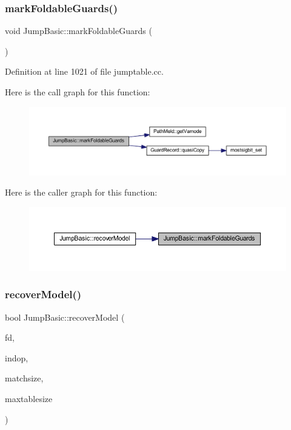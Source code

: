 \subsubsection{\texorpdfstring{markFoldableGuards()}{markFoldableGuards()}}
{\footnotesize\ttfamily void Jump\+Basic\+::mark\+Foldable\+Guards (\begin{DoxyParamCaption}\item[{void}]{ }\end{DoxyParamCaption})\hspace{0.3cm}{\ttfamily [protected]}}



Definition at line 1021 of file jumptable.\+cc.

Here is the call graph for this function\+:
\nopagebreak
\begin{figure}[H]
\begin{center}
\leavevmode
\includegraphics[width=350pt]{class_jump_basic_a8a8537f11c7ee4431d0b7ccce30d3241_cgraph}
\end{center}
\end{figure}
Here is the caller graph for this function\+:
\nopagebreak
\begin{figure}[H]
\begin{center}
\leavevmode
\includegraphics[width=350pt]{class_jump_basic_a8a8537f11c7ee4431d0b7ccce30d3241_icgraph}
\end{center}
\end{figure}
\mbox{\label{class_jump_basic_aebf055ad4baf1a138107d8dd3a40c809}} 
\subsubsection{\texorpdfstring{recoverModel()}{recoverModel()}}
{\footnotesize\ttfamily bool Jump\+Basic\+::recover\+Model (\begin{DoxyParamCaption}\item[{\mbox{\hyperlink{class_funcdata}{Funcdata}} $\ast$}]{fd,  }\item[{\mbox{\hyperlink{class_pcode_op}{Pcode\+Op}} $\ast$}]{indop,  }\item[{uint4}]{matchsize,  }\item[{uint4}]{maxtablesize }\end{DoxyParamCaption})\hspace{0.3cm}{\ttfamily [virtual]}}



